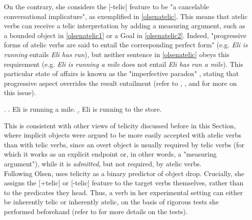 On the contrary, she considers the [-telic] feature to be "a cancelable conversational implicature", as exemplified in \ref{olsenatelic}. This means that atelic verbs can receive a telic interpretation by adding a measuring argument, such as a bounded object in \ref{olsenatelic1} or a Goal in \ref{olsenatelic2}. Indeed, "progressive forms of atelic verbs are said to entail the corresponding perfect form" (e.g. \textit{Eli is running} entails \textit{Eli has run}), but neither sentence in \ref{olsenatelic} obeys this requirement (e.g. \textit{Eli is running a mile} does not entail \textit{Eli has run a mile}). This particular state of affairs is known as the "imperfective paradox" \parencite{dowty2012word1979, white1993imperfective}, stating that progressive aspect overrides the result entailment (refer to \textcite{CopleyHarley2015force}, \textcite[115]{Dvorak2017thesis}, and \textcite{Melchin2019} for more on this issue).

\ex. \label{olsenatelic} \a. \label{olsenatelic1} Eli is running a mile.
\b. \label{olsenatelic2} Eli is running to the store.

This is consistent with other views of telicity discussed before in this Section, where implicit objects were argued to be more easily accepted with atelic verbs than with telic verbs, since an overt object is usually required by telic verbs (for which it works as an explicit endpoint or, in other words, a "measuring argument"), while it is \textit{admitted}, but not required, by atelic verbs.\\
Following Olsen, \textcite{Medina2007} uses telicity as a binary predictor of object drop. Crucially, she assigns the [+telic] or [-telic] feature to the target verbs themselves, rather than to the predicates they head. Thus, a verb in her experimental setting can either be inherently telic or inherently atelic, on the basis of rigorous tests she performed beforehand (refer to  for more details on the tests).


